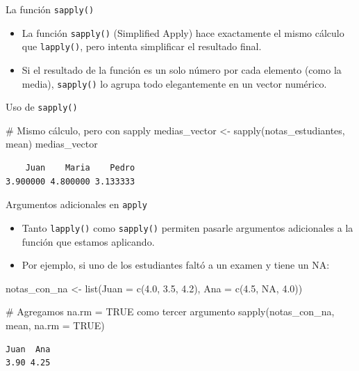 \documentclass[
  ignorenonframetext,
  aspectratio=169,
  spanish,
]{beamer}
\newenvironment{Shaded}{\begin{snugshade}}{\end{snugshade}}
\newcommand{\AttributeTok}[1]{\textcolor[rgb]{0.40,0.45,0.13}{#1}}
\newcommand{\CommentTok}[1]{\textcolor[rgb]{0.37,0.37,0.37}{#1}}
\newcommand{\ConstantTok}[1]{\textcolor[rgb]{0.56,0.35,0.01}{#1}}
\newcommand{\FloatTok}[1]{\textcolor[rgb]{0.68,0.00,0.00}{#1}}
\newcommand{\FunctionTok}[1]{\textcolor[rgb]{0.28,0.35,0.67}{#1}}
\newcommand{\NormalTok}[1]{\textcolor[rgb]{0.00,0.23,0.31}{#1}}
\newcommand{\OtherTok}[1]{\textcolor[rgb]{0.00,0.23,0.31}{#1}}
\begin{document}
\begin{frame}[fragile]{La función \texttt{sapply()}}
\label{la-funciuxf3n-sapply}
\begin{itemize}
\item
  La función \texttt{sapply()} (Simplified Apply) hace exactamente el
  mismo cálculo que \texttt{lapply()}, pero intenta simplificar el
  resultado final.
\item
  Si el resultado de la función es un solo número por cada elemento
  (como la media), \texttt{sapply()} lo agrupa todo elegantemente en un
  vector numérico.
\end{itemize}
\end{frame}

\begin{frame}[fragile]{Uso de \texttt{sapply()}}
\label{uso-de-sapply}
\begin{Shaded}
\begin{Highlighting}[]
\CommentTok{\# Mismo cálculo, pero con sapply}
\NormalTok{medias\_vector }\OtherTok{\textless{}{-}} \FunctionTok{sapply}\NormalTok{(notas\_estudiantes, mean)}
\NormalTok{medias\_vector}
\end{Highlighting}
\end{Shaded}

\begin{verbatim}
    Juan    Maria    Pedro 
3.900000 4.800000 3.133333 
\end{verbatim}
\end{frame}

\begin{frame}[fragile]{Argumentos adicionales en \texttt{apply}}
\label{argumentos-adicionales-en-apply}
\begin{itemize}
\item
  Tanto \texttt{lapply()} como \texttt{sapply()} permiten pasarle
  argumentos adicionales a la función que estamos aplicando.
\item
  Por ejemplo, si uno de los estudiantes faltó a un examen y tiene un
  NA:
\end{itemize}

\begin{Shaded}
\begin{Highlighting}[]
\NormalTok{notas\_con\_na }\OtherTok{\textless{}{-}} \FunctionTok{list}\NormalTok{(}\AttributeTok{Juan =} \FunctionTok{c}\NormalTok{(}\FloatTok{4.0}\NormalTok{, }\FloatTok{3.5}\NormalTok{, }\FloatTok{4.2}\NormalTok{), }\AttributeTok{Ana =} \FunctionTok{c}\NormalTok{(}\FloatTok{4.5}\NormalTok{, }\ConstantTok{NA}\NormalTok{, }\FloatTok{4.0}\NormalTok{))}

\CommentTok{\# Agregamos na.rm = TRUE como tercer argumento}
\FunctionTok{sapply}\NormalTok{(notas\_con\_na, mean, }\AttributeTok{na.rm =} \ConstantTok{TRUE}\NormalTok{)}
\end{Highlighting}
\end{Shaded}

\begin{verbatim}
Juan  Ana 
3.90 4.25 
\end{verbatim}
\end{frame}
\end{document}

